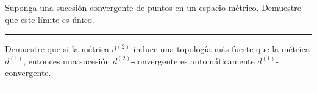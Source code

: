 %
%
\setcounter{isubsheet}{1}


\begin{ejercicio}
\item
  Suponga una sucesión convergente de puntos en un espacio métrico.
  Demuestre que este límite es único.

\medskip
{\color{gray}
\hrule
}

\item
  Demuestre que si la métrica $d^{(2)}$ induce una topología más fuerte que la
  métrica $d^{(1)}$, entonces una sucesión $d^{(2)}$-convergente es
  automáticamente $d^{(1)}$-convergente.

\medskip
{\color{gray}
\hrule
}



\end{ejercicio}
